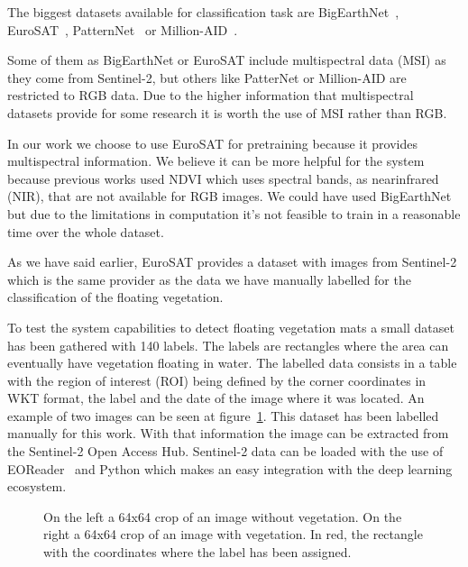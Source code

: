 \documentclass[conference]{IEEEtran}
\begin{document}
    The biggest datasets available for classification task are BigEarthNet~\cite{bigearthnet}, EuroSAT~\cite{helber2019eurosat},
    PatternNet~\cite{patternet} or Million-AID~\cite{millionaid}.

    Some of them as BigEarthNet or EuroSAT include multispectral data (MSI) as they come from Sentinel-2, but others like PatterNet or Million-AID are restricted to RGB data.
    Due to the higher information that multispectral datasets provide for some research it is worth the use of MSI rather than RGB\@.

    In our work we choose to use EuroSAT for pretraining because it provides multispectral information.
    We believe it can be more helpful for the system because previous works used NDVI which uses spectral bands, as nearinfrared (NIR), that are not available for RGB images.
    We could have used BigEarthNet but due to the limitations in computation it's not feasible to train in a reasonable time over the whole dataset.

    As we have said earlier, EuroSAT provides a dataset with images from Sentinel-2 which is the same provider as the data
    we have manually labelled for the classification of the floating vegetation.

    To test the system capabilities to detect floating vegetation mats a small dataset has been gathered with 140 labels.
    The labels are rectangles where the area can eventually have vegetation floating in water.
    The labelled data consists in a table with the region of interest (ROI) being defined by the corner coordinates in WKT format, the label and the date
    of the image where it was located.
    An example of two images can be seen at figure~\ref{fig:vegetation_example}.
    This dataset has been labelled manually for this work.
    With that information the image can be extracted from the Sentinel-2 Open Access Hub.
    Sentinel-2 data can be loaded with the use of EOReader~\cite{eoreader_paper} and Python which makes an easy integration with the deep learning ecosystem.

    \begin{figure}[h]
        \centering
        \qquad
        \caption{On the left a 64x64 crop of an image without vegetation. On the right a 64x64 crop of an image with vegetation.
        In red, the rectangle with the coordinates where the label has been assigned.}
        \label{fig:vegetation_example}
    \end{figure}
\end{document}
